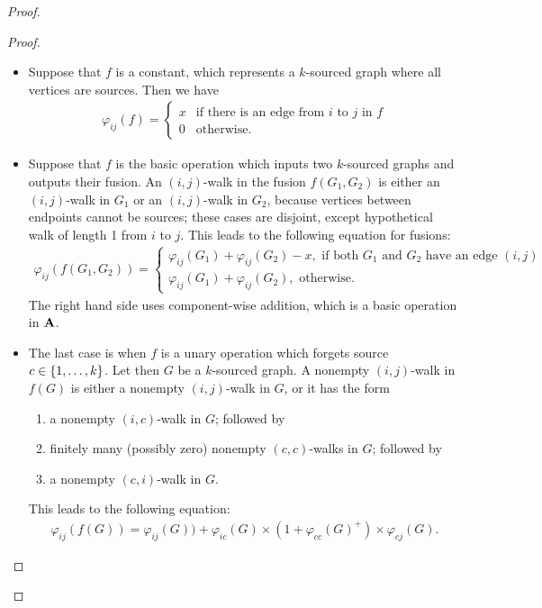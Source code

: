 \begin{proof}
\begin{proof}
            \begin{itemize}
                \item Suppose that $f$ is a constant, which represents a  $k$-sourced graph where all vertices are sources. Then we have 
                \begin{align*}
                \varphi_{ij}(f) = \begin{cases}
                    x & \text{if there is an edge from $i$ to $j$ in $f$}\\
                    0 & \text{otherwise.}
                \end{cases}
                \end{align*}
                \item Suppose that $f$ is the  basic operation which inputs two $k$-sourced graphs and outputs their fusion.  
                An $(i,j)$-walk in the fusion $f(G_1,G_2)$ is either an $(i,j)$-walk in $G_1$ or an $(i,j)$-walk in $G_2$, because vertices between endpoints cannot be sources; these cases are disjoint, except hypothetical walk of length 1 from $i$ to $j$. %
  		This leads to the following equation for fusions:
                \begin{align*}
                \varphi_{ij}(f(G_1,G_2)) = \begin{cases}
                	\varphi_{ij}(G_1) + \varphi_{ij}(G_2) - x, \text{ if both $G_1$ and $G_2$ have an edge $(i, j)$}\\
                	\varphi_{ij}(G_1) + \varphi_{ij}(G_2), \text{ otherwise}.
                \end{cases}
                \end{align*}
                The right hand side uses component-wise addition, which is a basic operation in $\mathbf{A}$.
                \item The last case is when $f$ is a unary operation which forgets  source $c \in \{1,\ldots,k\}$.  Let then $G$ be a $k$-sourced graph. A nonempty $(i,j)$-walk in $f(G)$ is either a nonempty $(i,j)$-walk in $G$, or it has the form
                \begin{enumerate}
                    \item a nonempty $(i,c)$-walk in $G$; followed by 
                    \item finitely many (possibly zero) nonempty  $(c,c)$-walks in $G$; followed by
                    \item a nonempty $(c,i)$-walk in $G$.
                \end{enumerate}
                This leads to the following equation:
                \begin{align*}
                \varphi_{ij}(f(G)) = \varphi_{ij}(G)) +  \varphi_{ic}(G) \times (1+ \varphi_{cc}(G)^+)  \times \varphi_{cj}(G).
                \end{align*}                
            \end{itemize}
        \end{proof}
        
\end{proof}

